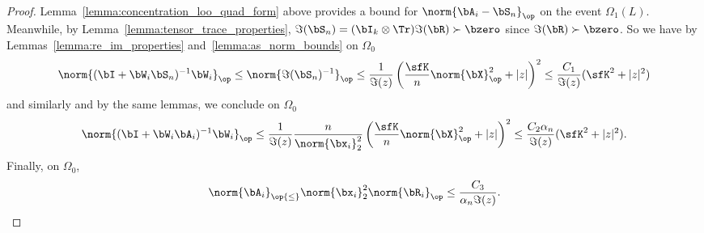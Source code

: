 \begin{proof}
Lemma~\ref{lemma:concentration_loo_quad_form} above provides a bound for $\norm{\bA_i -\bS_n}_\op$ on the event $\Omega_1(L)$. Meanwhile, by Lemma~\ref{lemma:tensor_trace_properties}, $\Im(\bS_n) = (\bI_k \otimes \Tr)\Im(\bR) \succ\bzero $ since $\Im(\bR) \succ\bzero$. So we have by Lemmas~\ref{lemma:re_im_properties} and~\ref{lemma:as_norm_bounds} on $\Omega_0$
\begin{equation}
\nonumber
    \norm{(\bI + \bW_i\bS_n)^{-1}\bW_i}_\op 
    \le \norm{\Im(\bS_n)^{-1}}_\op
    \le   \frac{1}{\Im(z)} \left( \frac{\sfK}{n} \norm{\bX}_\op^2 + |z|\right)^2 \le \frac{C_1}{\Im(z)} (\sfK^2 + |z|^2)
\end{equation}
and similarly and by the same lemmas, we conclude on $\Omega_0$
\begin{equation}
\nonumber
    \norm{(\bI + \bW_i\bA_i)^{-1}\bW_i}_\op 
    \le   \frac{1}{\Im(z)} \frac{n}{\norm{\bx_i}_2^2} \left(\frac{\sfK}{n} \norm{\bX}_\op^2 + |z|\right)^2 
    \le \frac{C_2 \alpha_n}{\Im(z)} (\sfK^2 + |z|^2).
\end{equation}
%
Finally, on $\Omega_0$,
\begin{equation}
\nonumber
   \norm{\bA_i}_\op {\le} \norm{\bx_i}_2^2 \norm{\bR_i}_\op \le \frac{C_3}{\alpha_n \Im(z)}.
\end{equation}


\end{proof}
